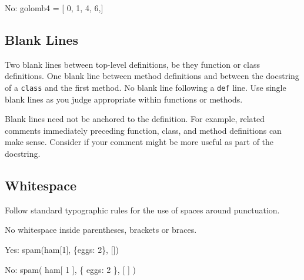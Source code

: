 \documentclass[
]{article}
\newenvironment{Shaded}{}{}
\newcommand{\DecValTok}[1]{\textcolor[rgb]{0.25,0.63,0.44}{#1}}
\newcommand{\NormalTok}[1]{#1}
\newcommand{\OperatorTok}[1]{\textcolor[rgb]{0.40,0.40,0.40}{#1}}
\newcommand{\StringTok}[1]{\textcolor[rgb]{0.25,0.44,0.63}{#1}}
\begin{document}
\begin{samepage}
\begin{Shaded}
\begin{Highlighting}[]
\NormalTok{No:    golomb4 }\OperatorTok{=}\NormalTok{ [}
           \DecValTok{0}\NormalTok{,}
           \DecValTok{1}\NormalTok{,}
           \DecValTok{4}\NormalTok{,}
           \DecValTok{6}\NormalTok{,]}
\end{Highlighting}
\end{Shaded}
\end{samepage}

\subsection{Blank Lines}

Two blank lines between top-level definitions, be they function or class
definitions. One blank line between method definitions and between the
docstring of a \texttt{class} and the first method. No blank line
following a \texttt{def} line. Use single blank lines as you judge
appropriate within functions or methods.

Blank lines need not be anchored to the definition. For example, related
comments immediately preceding function, class, and method definitions
can make sense. Consider if your comment might be more useful as part of
the docstring.

\subsection{Whitespace}

Follow standard typographic rules for the use of spaces around
punctuation.

No whitespace inside parentheses, brackets or braces.

\begin{samepage}
\begin{Shaded}
\begin{Highlighting}[]
\NormalTok{Yes: spam(ham[}\DecValTok{1}\NormalTok{], \{}\StringTok{\textquotesingle{}eggs\textquotesingle{}}\NormalTok{: }\DecValTok{2}\NormalTok{\}, [])}
\end{Highlighting}
\end{Shaded}
\end{samepage}

\begin{samepage}
\begin{Shaded}
\begin{Highlighting}[]
\NormalTok{No:  spam( ham[ }\DecValTok{1}\NormalTok{ ], \{ }\StringTok{\textquotesingle{}eggs\textquotesingle{}}\NormalTok{: }\DecValTok{2}\NormalTok{ \}, [ ] )}
\end{Highlighting}
\end{Shaded}
\end{samepage}
\end{document}
